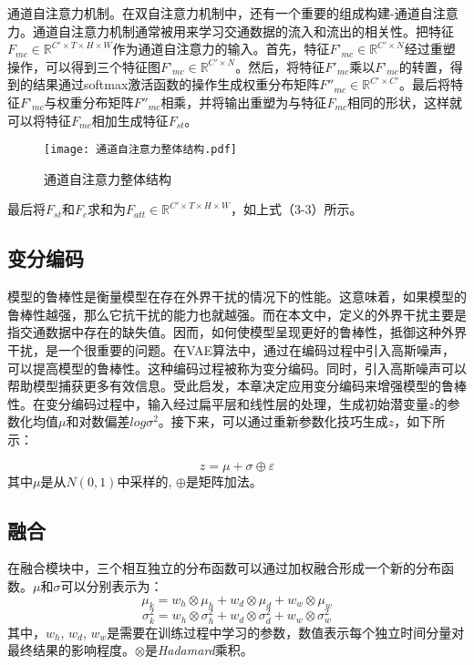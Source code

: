 通道自注意力机制。在双自注意力机制中，还有一个重要的组成构建-通道自注意力。通道自注意力机制通常被用来学习交通数据的流入和流出的相关性。把特征$F_{mc}\in \mathbb{R}^{C'\times T\times H\times W}$作为通道自注意力的输入。首先，特征$F’_{mc}\in \mathbb{R}^{C'\times N}$经过重塑操作，可以得到三个特征图$F’_{mc}\in \mathbb{R}^{C'\times N}$。然后，将特征$F'_{mc}$乘以$F’_{mc}$的转置，得到的结果通过softmax激活函数的操作生成权重分布矩阵$F''_{mc}\in \mathbb{R}^{C'\times C'}$。最后将特征$F’_{mc}$与权重分布矩阵$F''_{mc}$相乘，并将输出重塑为与特征$F_{mc}$相同的形状，这样就可以将特征$F_{mc}$相加生成特征$F_{st}$。
\begin{figure}[htbp]
\vspace{-0.2cm}
\centerline{\texttt{[image: 通道自注意力整体结构.pdf]}}
\caption{通道自注意力整体结构}
\label{fig}
\vspace{-0.2cm}
\end{figure}

最后将$F_{st}$和$F_{c}$求和为$F_{att}\in \mathbb{R}^{C'\times T\times H\times W}$，如上式（3-3）所示。

\subsection{变分编码}
模型的鲁棒性是衡量模型在存在外界干扰的情况下的性能。这意味着，如果模型的鲁棒性越强，那么它抗干扰的能力也就越强。而在本文中，定义的外界干扰主要是指交通数据中存在的缺失值。因而，如何使模型呈现更好的鲁棒性，抵御这种外界干扰，是一个很重要的问题。在VAE\cite{18}算法中，通过在编码过程中引入高斯噪声，可以提高模型的鲁棒性。这种编码过程被称为变分编码。同时，引入高斯噪声可以帮助模型捕获更多有效信息。受此启发，本章决定应用变分编码来增强模型的鲁棒性。在变分编码过程中，输入经过扁平层和线性层的处理，生成初始潜变量$z$的参数化均值$\mu$和对数偏差$log{\sigma}^2$。接下来，可以通过重新参数化技巧\cite{16}生成$z$，如下所示：

\begin{equation}
z=\mu+\sigma\oplus\varepsilon
\end{equation}  
其中${\mu}$是从$\mathit{N}(0,1)$中采样的, $\oplus$是矩阵加法。
\subsection{融合}
在融合模块中，三个相互独立的分布函数可以通过加权融合形成一个新的分布函数。$\mu$和$\sigma$可以分别表示为：
\begin{equation}
{\mu}_k=w_h\otimes {\mu}_h+w_d\otimes {\mu}_d+w_w\otimes {\mu}_w
\end{equation}
\begin{equation}
{\sigma}_k^2=w_h\otimes {\sigma}_h^2+w_d\otimes {\sigma}_d^2+w_w\otimes {\sigma}_w^2
\end{equation}
其中，$w_h$, $w_d$, $w_w$是需要在训练过程中学习的参数，数值表示每个独立时间分量对最终结果的影响程度。$\otimes$是\textit{Hadamard}乘积。
